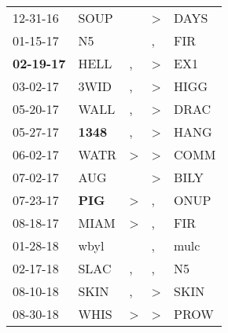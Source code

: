 \begin{supertabular}{p{0.07\textwidth}p{0.06\textwidth}p{0.02\textwidth}p{0.02\textwidth}p{0.06\textwidth}}
          12-31-16\textsuperscript{} &           SOUP\textsuperscript{} &                  &  \textgreater &          DAYS\textsuperscript{} \\
          01-15-17\textsuperscript{} &             N5\textsuperscript{} &                  &             , &           FIR\textsuperscript{} \\
 \textbf{02-19-17\textsuperscript{}} &           HELL\textsuperscript{} &                , &  \textgreater &           EX1\textsuperscript{} \\
          03-02-17\textsuperscript{} &           3WID\textsuperscript{} &                , &  \textgreater &          HIGG\textsuperscript{} \\
          05-20-17\textsuperscript{} &           WALL\textsuperscript{} &                , &  \textgreater &          DRAC\textsuperscript{} \\
          05-27-17\textsuperscript{} &  \textbf{1348\textsuperscript{}} &                , &  \textgreater &          HANG\textsuperscript{} \\
          06-02-17\textsuperscript{} &           WATR\textsuperscript{} &     \textgreater &  \textgreater &          COMM\textsuperscript{} \\
          07-02-17\textsuperscript{} &            AUG\textsuperscript{} &                  &  \textgreater &          BILY\textsuperscript{} \\
          07-23-17\textsuperscript{} &   \textbf{PIG\textsuperscript{}} &     \textgreater &             , &          ONUP\textsuperscript{} \\
          08-18-17\textsuperscript{} &           MIAM\textsuperscript{} &     \textgreater &             , &           FIR\textsuperscript{} \\
          01-28-18\textsuperscript{} &           wbyl\textsuperscript{} &                  &             , &          mulc\textsuperscript{} \\
          02-17-18\textsuperscript{} &           SLAC\textsuperscript{} &                , &             , &            N5\textsuperscript{} \\
          08-10-18\textsuperscript{} &           SKIN\textsuperscript{} &                , &  \textgreater &          SKIN\textsuperscript{} \\
          08-30-18\textsuperscript{} &           WHIS\textsuperscript{} &     \textgreater &  \textgreater &          PROW\textsuperscript{} \\

\end{supertabular}
